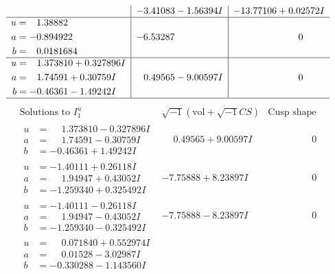 \documentclass[1p]{elsarticle_modified}
\theoremstyle{definition}
\newcommand{\I}{\sqrt{-1}}
\begin{document}
$$\begin{array}{c|c|c}
 & -3.41083 - 1.56394 I & -13.77106 + 0.02572 I \\ \hline\begin{aligned}
u &= \phantom{-}1.38882\phantom{ +0.000000I} \\
a &= -0.894922\phantom{ +0.000000I} \\
b &= \phantom{-}0.0181684\phantom{ +0.000000I}\end{aligned}
 & -6.53287\phantom{ +0.000000I} & \phantom{-0.000000 } 0 \\ \hline\begin{aligned}
u &= \phantom{-}1.373810 + 0.327896 I \\
a &= \phantom{-}1.74591 + 0.30759 I \\
b &= -0.46361 - 1.49242 I\end{aligned}
 & \phantom{-}0.49565 - 9.00597 I & \phantom{-0.000000 } 0\\
 \hline 
 \end{array}$$\newpage$$\begin{array}{c|c|c}  
\text{Solutions to }I^u_{1}& \I (\text{vol} + \sqrt{-1}CS) & \text{Cusp shape}\\
 \hline 
\begin{aligned}
u &= \phantom{-}1.373810 - 0.327896 I \\
a &= \phantom{-}1.74591 - 0.30759 I \\
b &= -0.46361 + 1.49242 I\end{aligned}
 & \phantom{-}0.49565 + 9.00597 I & \phantom{-0.000000 } 0 \\ \hline\begin{aligned}
u &= -1.40111 + 0.26118 I \\
a &= \phantom{-}1.94947 + 0.43052 I \\
b &= -1.259340 + 0.325492 I\end{aligned}
 & -7.75888 + 8.23897 I & \phantom{-0.000000 } 0 \\ \hline\begin{aligned}
u &= -1.40111 - 0.26118 I \\
a &= \phantom{-}1.94947 - 0.43052 I \\
b &= -1.259340 - 0.325492 I\end{aligned}
 & -7.75888 - 8.23897 I & \phantom{-0.000000 } 0 \\ \hline\begin{aligned}
u &= \phantom{-}0.071840 + 0.552974 I \\
a &= \phantom{-}0.01528 - 3.02987 I \\
b &= -0.330288 - 1.143560 I\end{aligned}

\end{array}$$
\end{document}
